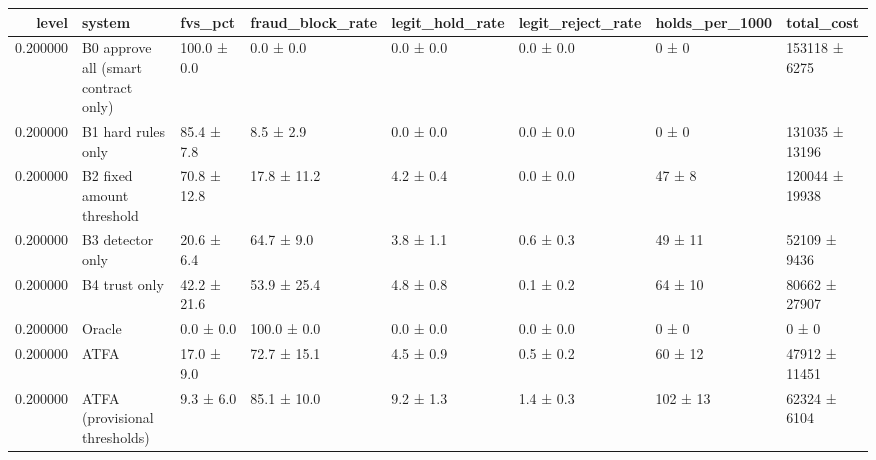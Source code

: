 \begin{tabular}{rlllllll}
\toprule
level & system & fvs\_pct & fraud\_block\_rate & legit\_hold\_rate & legit\_reject\_rate & holds\_per\_1000 & total\_cost \\
\midrule
0.200000 & B0 approve all (smart contract only) & 100.0 ± 0.0 & 0.0 ± 0.0 & 0.0 ± 0.0 & 0.0 ± 0.0 & 0 ± 0 & 153118 ± 6275 \\
0.200000 & B1 hard rules only & 85.4 ± 7.8 & 8.5 ± 2.9 & 0.0 ± 0.0 & 0.0 ± 0.0 & 0 ± 0 & 131035 ± 13196 \\
0.200000 & B2 fixed amount threshold & 70.8 ± 12.8 & 17.8 ± 11.2 & 4.2 ± 0.4 & 0.0 ± 0.0 & 47 ± 8 & 120044 ± 19938 \\
0.200000 & B3 detector only & 20.6 ± 6.4 & 64.7 ± 9.0 & 3.8 ± 1.1 & 0.6 ± 0.3 & 49 ± 11 & 52109 ± 9436 \\
0.200000 & B4 trust only & 42.2 ± 21.6 & 53.9 ± 25.4 & 4.8 ± 0.8 & 0.1 ± 0.2 & 64 ± 10 & 80662 ± 27907 \\
0.200000 & Oracle & 0.0 ± 0.0 & 100.0 ± 0.0 & 0.0 ± 0.0 & 0.0 ± 0.0 & 0 ± 0 & 0 ± 0 \\
0.200000 & ATFA & 17.0 ± 9.0 & 72.7 ± 15.1 & 4.5 ± 0.9 & 0.5 ± 0.2 & 60 ± 12 & 47912 ± 11451 \\
0.200000 & ATFA (provisional thresholds) & 9.3 ± 6.0 & 85.1 ± 10.0 & 9.2 ± 1.3 & 1.4 ± 0.3 & 102 ± 13 & 62324 ± 6104 \\
\bottomrule
\end{tabular}
